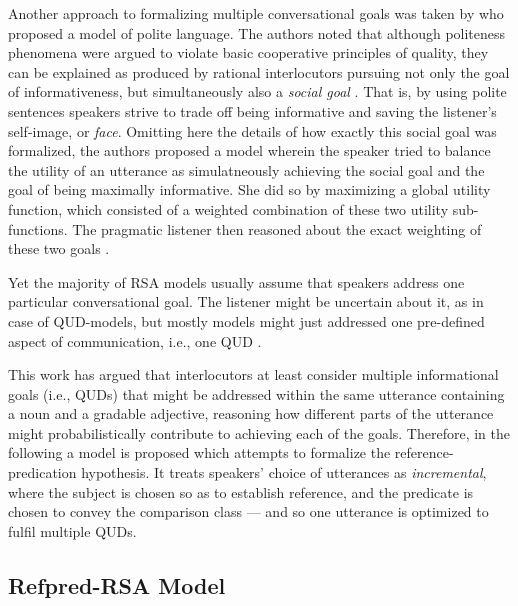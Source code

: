 Another approach to formalizing multiple conversational goals was taken by \textcite{yoon2016talking} who proposed a model of polite language. The authors noted that although politeness phenomena were argued to violate basic cooperative principles of quality, they can be explained as produced by rational interlocutors pursuing not only the goal of informativeness, but simultaneously also a \emph{social goal} \parencite[cf.][]{brown1987politeness, yoon2016talking}. That is, by using polite sentences speakers strive to trade off being informative and saving the listener's self-image, or \emph{face}. Omitting here the details of how exactly this social goal was formalized, the authors proposed a model wherein the speaker tried to balance the utility of an utterance as simulatneously achieving the social goal and the goal of being maximally informative. She did so by maximizing a global utility function, which consisted of a weighted combination of these two utility sub-functions. The pragmatic listener then reasoned about the exact weighting of these two goals \parencite{yoon2016talking}. 

Yet the majority of RSA models usually assume that speakers address one particular conversational goal. The listener might be uncertain about it, as in case of QUD-models, but mostly models might just addressed one pre-defined aspect of communication, i.e., one QUD \parencite[see][for an excellent overview of various RSA models]{problang}. 

This work has argued that interlocutors at least consider multiple informational goals (i.e., QUDs) that might be addressed within the same utterance containing a noun and a gradable adjective, reasoning how different parts of the utterance might probabilistically contribute to achieving each of the goals. Therefore, in the following a model is proposed which attempts to formalize the reference-predication hypothesis. It treats speakers' choice of utterances as \emph{incremental}, where the subject is chosen so as to establish reference, and the predicate is chosen to convey the comparison class --- and so one utterance is optimized to fulfil multiple QUDs. 

\subsection{Refpred-RSA Model}

